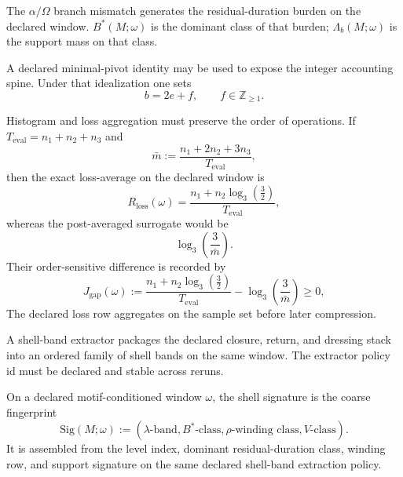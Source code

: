 \begin{remarkx}
\label{rem:bstar-class}
The $\alpha/\Omega$ branch mismatch generates the residual-duration burden on the declared window. $B^*(M;\omega)$ is the dominant class of that burden; $\Lambda_b(M;\omega)$ is the support mass on that class.
\end{remarkx}

\begin{choice}
\label{choice:high-rung-pivot}
A declared minimal-pivot identity may be used to expose the integer accounting spine. Under that idealization one sets
\[
b=2e+f,\qquad f\in\mathbb Z_{\ge1}.
\]
\end{choice}

\begin{remarkx}
\label{rem:jensen}
Histogram and loss aggregation must preserve the order of operations. If $T_{\mathrm{eval}}=n_1+n_2+n_3$ and
\[
\bar m:=\frac{n_1+2n_2+3n_3}{T_{\mathrm{eval}}},
\]
then the exact loss-average on the declared window is
\[
R_{\mathrm{loss}}(\omega)=\frac{n_1+n_2\log_3\!\left(\frac{3}{2}\right)}{T_{\mathrm{eval}}},
\]
whereas the post-averaged surrogate would be
\[
\log_3\!\left(\frac{3}{\bar m}\right).
\]
Their order-sensitive difference is recorded by
\[
J_{\mathrm{gap}}(\omega):=
\frac{n_1+n_2\log_3\!\left(\frac{3}{2}\right)}{T_{\mathrm{eval}}}
-
\log_3\!\left(\frac{3}{\bar m}\right)\ge 0,
\]
The declared loss row aggregates on the sample set before later compression.
\end{remarkx}

\begin{choice}
\label{choice:shell-band-extractor}
A shell-band extractor packages the declared closure, return, and dressing stack into an ordered family of shell bands on the same window. The extractor policy id must be declared and stable across reruns.
\end{choice}

\begin{definition}
\label{def:shell-signature}
On a declared motif-conditioned window $\omega$, the shell signature is the coarse fingerprint
\[
\mathrm{Sig}(M;\omega):=(\lambda\text{-band}, B^*\text{-class}, \rho\text{-winding class}, V\text{-class}).
\]
It is assembled from the level index, dominant residual-duration class, winding row, and support signature on the same declared shell-band extraction policy.
\end{definition}

